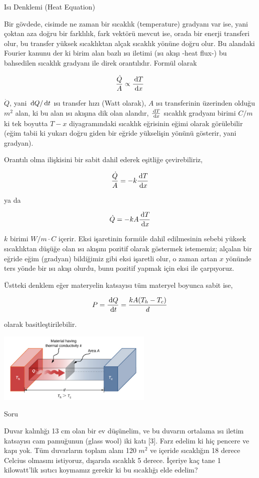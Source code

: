 \documentclass[12pt,fleqn]{article}\usepackage{../../common}
\begin{document}
Isı Denklemi (Heat Equation)

Bir gövdede, cisimde ne zaman bir sıcaklık (temperature) gradyanı var ise, yani
çoktan aza doğru bir farklılık, fark vektörü mevcut ise, orada bir enerji
transferi olur, bu transfer yüksek sıcaklıktan alçak sıcaklık yönüne doğru
olur. Bu alandaki Fourier kanunu der ki birim alan bazlı ısı iletimi (ısı akışı
-heat flux-) bu bahsedilen sıcaklık gradyanı ile direk orantılıdır. Formül
olarak

$$
\frac{\dot{Q}}{A} \propto \frac{\,\mathrm{d} T}{\,\mathrm{d} x}
$$

$\dot{Q}$, yani $\,\mathrm{d} Q / \,\mathrm{d} t$ ısı transfer hızı (Watt olarak), $A$ ısı
transferinin üzerinden olduğu $m^2$ alan, ki bu alan ısı akışına dik olan
alandır, $\frac{\,\mathrm{d} T}{\,\mathrm{d} x}$ sıcaklık gradyanı birimi $C / m$ ki tek boyutta
$T-x$ diyagramındaki sıcaklık eğrisinin eğimi olarak görülebilir (eğim tabii ki
yukarı doğru giden bir eğride yükselişin yönünü gösterir, yani gradyan).

Orantılı olma ilişkisini bir sabit dahil ederek eşitliğe çevirebiliriz,

$$
\frac{\dot{Q}}{A} = -k \frac{\,\mathrm{d} T}{\,\mathrm{d} x}
$$

ya da

$$
\dot{Q} = -k A \frac{\,\mathrm{d} T}{\,\mathrm{d} x}
$$

$k$ birimi $W/m \cdot C$ içerir. Eksi işaretinin formüle dahil edilmesinin sebebi
yüksek sıcaklıktan düşüğe olan ısı akışını pozitif olarak göstermek istememiz;
alçalan bir eğride eğim (gradyan) bildiğimiz gibi eksi işaretli olur, o zaman
artan $x$ yönünde ters yönde bir ısı akışı olurdu, bunu pozitif yapmak için eksi
ile çarpıyoruz.

Üstteki denklem eğer materyelin katsayısı tüm materyel boyunca sabit ise, 

$$
P = \frac{\,\mathrm{d} Q}{\,\mathrm{d} t} = \frac{k A (T_h - T_c)}{d}
$$

olarak basitleştirilebilir.

\includegraphics[width=20em]{heat_2.png}

Soru

Duvar kalınlığı 13 cm olan bir ev düşünelim, ve bu duvarın ortalama ısı iletim
katsayısı cam pamuğunun (glass wool) iki katı [3]. Farz edelim ki hiç pencere ve
kapı yok. Tüm duvarların toplam alanı 120 $m^2$ ve içeride sıcaklığın 18 derece
Celcius olmasını istiyoruz, dışarıda sıcaklık 5 derece. İçeriye kaç tane 1
kilowatt'lik ısıtıcı koymamız gerekir ki bu sıcaklığı elde edelim?
\end{document}
